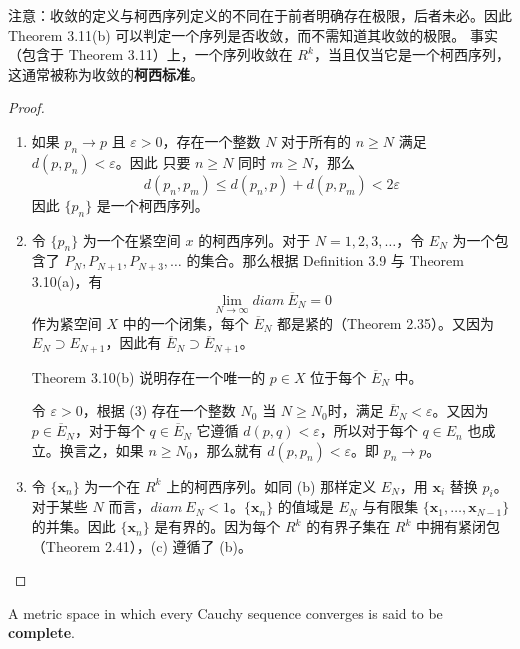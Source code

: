 \documentclass[../poma-notes.tex]{subfiles}
\begin{document}
注意：收敛的定义与柯西序列定义的不同在于前者明确存在极限，后者未必。因此 Theorem 3.11(b) 可以判定一个序列是否收敛，而不需知道其收敛的极限。
事实（包含于 Theorem 3.11）上，一个序列收敛在 $R^k$，当且仅当它是一个柯西序列，这通常被称为收敛的\textbf{柯西标准}。

\begin{proof}
  \begin{enumerate}[label=(\alph*)]
    \item 如果 $p_n \to p$ 且 $\varepsilon > 0$，存在一个整数 $N$ 对于所有的 $n \ge N$ 满足 $d(p,p_n) < \varepsilon$。因此
          只要 $n \ge N$ 同时 $m \ge N$，那么
          \[ d(p_n, p_m) \le d(p_n, p) + d(p, p_m) < 2\varepsilon \]
          因此 $\{p_n\}$ 是一个柯西序列。
    \item 令 $\{p_n\}$ 为一个在紧空间 $x$ 的柯西序列。对于 $N=1,2,3,\dots$，令 $E_N$ 为一个包含了 $P_N,P_{N+1},P_{N+3},\dots$
          的集合。那么根据 Definition 3.9 与 Theorem 3.10(a)，有
          \begin{equation}
            \lim_{N \to \infty} diam\ \overline{E}_N = 0
          \end{equation}
          作为紧空间 $X$ 中的一个闭集，每个 $\overline{E}_N$ 都是紧的（Theorem 2.35）。又因为 $E_N \supset E_{N+1}$，因此有
          $\overline{E}_N \supset \overline{E}_{N+1}$。

          Theorem 3.10(b) 说明存在一个唯一的 $p \in X$ 位于每个 $\overline{E}_N$ 中。

          令 $\varepsilon > 0$，根据 (3) 存在一个整数 $N_0$ 当 $N \ge N_0$时，满足 $\overline{E}_N < \varepsilon$。又因为
          $p \in \overline{E}_N$，对于每个 $q \in \overline{E}_N$ 它遵循 $d(p,q) < \varepsilon$，所以对于每个 $q \in E_n$
          也成立。换言之，如果 $n \ge N_0$，那么就有 $d(p,p_n)<\varepsilon$。即 $p_n \to p$。
    \item 令 $\{\mathbf{x}_n\}$ 为一个在 $R^k$ 上的柯西序列。如同 (b) 那样定义 $E_N$，用 $\mathbf{x}_i$ 替换 $p_i$。对于某些
          $N$ 而言，$diam\ E_N<1$。$\{\mathbf{x}_n\}$ 的值域是 $E_N$ 与有限集 $\{\mathbf{x}_1,\dots,\mathbf{x}_{N-1}\}$
          的并集。因此 $\{\mathbf{x}_n\}$ 是有界的。因为每个 $R^k$ 的有界子集在 $R^k$ 中拥有紧闭包（Theorem 2.41），(c) 遵循了
          (b)。
  \end{enumerate}
\end{proof}

\begin{definition}
  A metric space in which every Cauchy sequence converges is said to be \textbf{complete}.
\end{definition}
\end{document}
